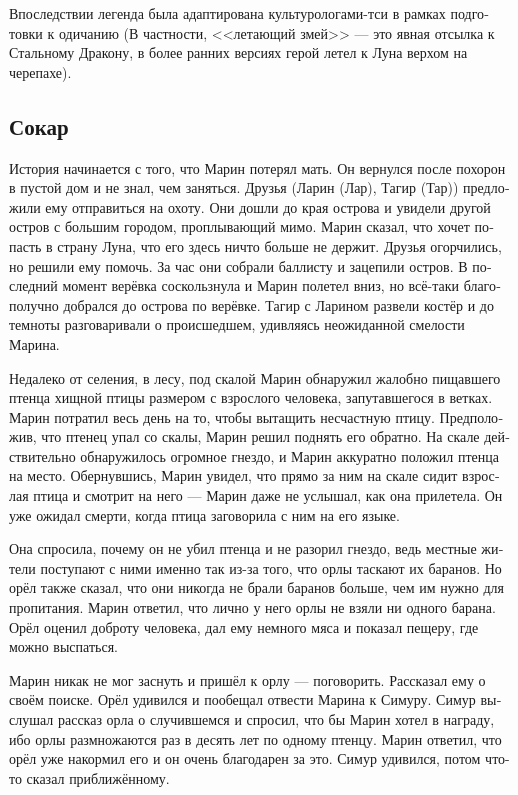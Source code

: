 \documentclass[a4paper,12pt,fleqn]{book}\usepackage{cooltooltips}\usepackage{polyglossia}\setdefaultlanguage[babelshorthands=true]{russian}\setotherlanguage{english}\defaultfontfeatures{Ligatures=TeX,Mapping=tex-text} \usepackage{xcolor}\definecolor{lightgray}{HTML}{bbbbbb}\color{lightgray}\newcommand{\ml}[3]{\textenglish{\textcolor{black}{#3}}}
\begin{document}
{Впоследствии легенда была адаптирована культурологами-тси в рамках подготовки к одичанию (В частности, <<летающий змей>> --- это явная отсылка к Стальному Дракону, в более ранних версиях герой летел к Луна верхом на черепахе).

\subsection{Сокар}

История начинается с того, что Марин потерял мать.
Он вернулся после похорон в пустой дом и не знал, чем заняться.
Друзья (Ларин (Лар), Тагир (Тар)) предложили ему отправиться на охоту.
Они дошли до края острова и увидели другой остров с большим городом, проплывающий мимо.
Марин сказал, что хочет попасть в страну Луна, что его здесь ничто больше не держит.
Друзья огорчились, но решили ему помочь.
За час они собрали баллисту и зацепили остров.
В последний момент верёвка соскользнула и Марин полетел вниз, но всё-таки благополучно добрался до острова по верёвке.
Тагир с Ларином развели костёр и до темноты разговаривали о происшедшем, удивляясь неожиданной смелости Марина.

Недалеко от селения, в лесу, под скалой Марин обнаружил жалобно пищавшего птенца хищной птицы размером с взрослого человека, запутавшегося в ветках.
Марин потратил весь день на то, чтобы вытащить несчастную птицу.
Предположив, что птенец упал со скалы, Марин решил поднять его обратно.
На скале действительно обнаружилось огромное гнездо, и Марин аккуратно положил птенца на место.
Обернувшись, Марин увидел, что прямо за ним на скале сидит взрослая птица и смотрит на него --- Марин даже не услышал, как она прилетела.
Он уже ожидал смерти, когда птица заговорила с ним на его языке.

Она спросила, почему он не убил птенца и не разорил гнездо, ведь местные жители поступают с ними именно так из-за того, что орлы таскают их баранов.
Но орёл также сказал, что они никогда не брали баранов больше, чем им нужно для пропитания.
Марин ответил, что лично у него орлы не взяли ни одного барана.
Орёл оценил доброту человека, дал ему немного мяса и показал пещеру, где можно выспаться.

Марин никак не мог заснуть и пришёл к орлу --- поговорить.
Рассказал ему о своём поиске.
Орёл удивился и пообещал отвести Марина к Симуру.
Симур выслушал рассказ орла о случившемся и спросил, что бы Марин хотел в награду, ибо орлы размножаются раз в десять лет по одному птенцу.
Марин ответил, что орёл уже накормил его и он очень благодарен за это.
Симур удивился, потом что-то сказал приближённому.

}
\end{document}
